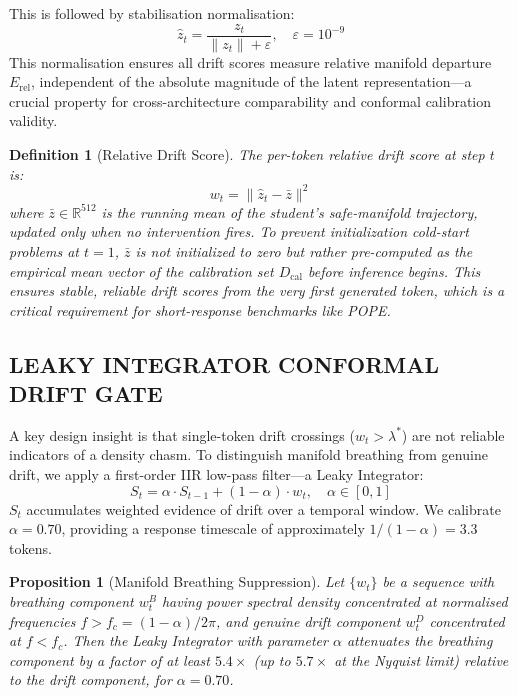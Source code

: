 \documentclass{ieeetmlcn}
\newtheorem{proposition}{Proposition}
\newtheorem{definition}{Definition}
\begin{document}
This is followed by stabilisation normalisation:
\begin{equation}
  \hat{z}_t = \frac{z_t}{\|z_t\| + \varepsilon}, \quad \varepsilon = 10^{-9}
  \label{eq:norm}
\end{equation}
This normalisation ensures all drift scores measure relative manifold departure $E_{\text{rel}}$, independent of the absolute magnitude of the latent representation---a crucial property for cross-architecture comparability and conformal calibration validity.


\begin{definition}[Relative Drift Score]
The per-token relative drift score at step $t$ is:
\begin{equation}
  w_t = \|\hat{z}_t - \bar{z}\|^2
  \label{eq:drift}
\end{equation}
where $\bar{z} \in \mathbb{R}^{512}$ is the running mean of the student's safe-manifold trajectory, updated only when no intervention fires. To prevent initialization cold-start problems at $t=1$, $\bar{z}$ is not initialized to zero but rather pre-computed as the empirical mean vector of the calibration set $D_{\text{cal}}$ before inference begins. This ensures stable, reliable drift scores from the very first generated token, which is a critical requirement for short-response benchmarks like POPE.
\end{definition}


\subsection{LEAKY INTEGRATOR CONFORMAL DRIFT GATE}
A key design insight is that single-token drift crossings ($w_t > \lambda^*$)
are not reliable indicators of a density chasm. To distinguish manifold
breathing from genuine drift, we apply a first-order IIR low-pass
filter---a Leaky Integrator:
\begin{equation}
  S_t = \alpha \cdot S_{t-1} + (1-\alpha) \cdot w_t, \quad \alpha \in [0,1]
  \label{eq:leaky}
\end{equation}
$S_t$ accumulates weighted evidence of drift over a temporal window. We
calibrate $\alpha = 0.70$, providing a response timescale of
approximately $1/(1-\alpha) = 3.3$ tokens.

\begin{proposition}[Manifold Breathing Suppression]
\label{prop:suppression}
Let $\{w_t\}$ be a sequence with breathing component $w_t^B$ having
power spectral density concentrated at normalised frequencies
$f > f_c = (1-\alpha)/2\pi$, and genuine drift component $w_t^D$
concentrated at $f < f_c$. Then the Leaky Integrator with parameter
$\alpha$ attenuates the breathing component by a factor of at least
$5.4\times$ (up to $5.7\times$ at the Nyquist limit) relative to the
drift component, for $\alpha = 0.70$.
\end{proposition}
\end{document}

